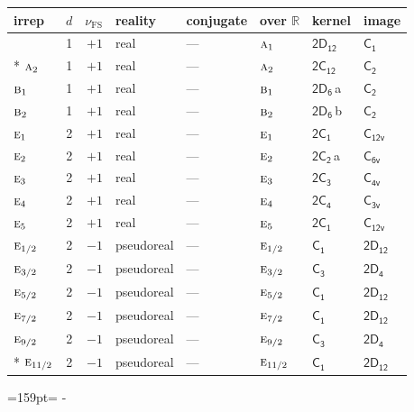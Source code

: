 \documentclass[10pt,a4paper]{article}
\makeatletter
\def\grouprule#1#2{\noalign{\marks\LTgroupmarks{\the\belowrulesep}\nobreak\vskip#1%
  \vskip\aboverulesep}\multispan\LT@cols\unskip{\leaders\hrule\@height#2\hfill\kern\z@}\cr
  \noalign{\penalty\LTrulebreak\vskip\belowrulesep\global\@lastruleclass\z@}}
\newcommand{\needspace}[1]{\par\penalty-100\begingroup\dimen0=#1\relax\dimen2=\pagegoal
  \advance\dimen2-\pagetotal\ifdim\dimen0>\dimen2\relax\ifdim\dimen2>0pt\vfil\break\fi\fi
  \endgroup}
\numberwithin{equation}{section}
\newcommand{\grp}[1]{\mathsf{#1}}
\newcommand{\irr}[1]{\text{\normalfont\scshape #1}}
\newcommand{\detbox}[1]{{\setlength{\fboxsep}{1pt}\fbox{#1}}}
\newcommand{\clsletter}[1]{\,{\scriptsize\color{black!55}#1}}
\newcommand{\fsind}{\nu_{\mathrm{FS}}}
\makeatother
\begin{document}
\setlength{\emergencystretch}{2em}\par\setlength{\emergencystretch}{0pt}
{\small\renewcommand{\arraystretch}{1.25}\setlength{\tabcolsep}{4pt}\begin{longtable}{@{}lrrlllll@{}}\toprule
irrep & $d$ & $\fsind$ & reality & conjugate & over $\mathbb{R}$ & kernel & image\\\midrule\endhead
\bottomrule\endfoot\endlastfoot
\detbox{$\irr{a}_{1}$} & 1 & $+1$ & real & --- & $\irr{a}_{1}$ & \href{2D12.pdf}{$\grp{2D_{12}}$} & \href{../../../rotation/data/pdf/C1.pdf}{$\grp{C_{1}}$}\\*
$\irr{a}_{2}$ & 1 & $+1$ & real & --- & $\irr{a}_{2}$ & \href{2C12.pdf}{$\grp{2C_{12}}$} & \href{../../../rotation/data/pdf/C2.pdf}{$\grp{C_{2}}$}\\
$\irr{b}_{1}$ & 1 & $+1$ & real & --- & $\irr{b}_{1}$ & \href{2D6.pdf}{$\grp{2D_{6}}$}\clsletter{a} & \href{../../../rotation/data/pdf/C2.pdf}{$\grp{C_{2}}$}\\
$\irr{b}_{2}$ & 1 & $+1$ & real & --- & $\irr{b}_{2}$ & \href{2D6.pdf}{$\grp{2D_{6}}$}\clsletter{b} & \href{../../../rotation/data/pdf/C2.pdf}{$\grp{C_{2}}$}\\
$\irr{e}_{1}$ & 2 & $+1$ & real & --- & $\irr{e}_{1}$ & \href{2C1.pdf}{$\grp{2C_{1}}$} & \href{../../../rotation/data/pdf/C12v.pdf}{$\grp{C_{12v}}$}\\
$\irr{e}_{2}$ & 2 & $+1$ & real & --- & $\irr{e}_{2}$ & \href{2C2.pdf}{$\grp{2C_{2}}$}\clsletter{a} & \href{../../../rotation/data/pdf/C6v.pdf}{$\grp{C_{6v}}$}\\
$\irr{e}_{3}$ & 2 & $+1$ & real & --- & $\irr{e}_{3}$ & \href{2C3.pdf}{$\grp{2C_{3}}$} & \href{../../../rotation/data/pdf/C4v.pdf}{$\grp{C_{4v}}$}\\
$\irr{e}_{4}$ & 2 & $+1$ & real & --- & $\irr{e}_{4}$ & \href{2C4.pdf}{$\grp{2C_{4}}$} & \href{../../../rotation/data/pdf/C3v.pdf}{$\grp{C_{3v}}$}\\
$\irr{e}_{5}$ & 2 & $+1$ & real & --- & $\irr{e}_{5}$ & \href{2C1.pdf}{$\grp{2C_{1}}$} & \href{../../../rotation/data/pdf/C12v.pdf}{$\grp{C_{12v}}$}\\
\grouprule{0pt}{\lightrulewidth}
$\irr{e}_{1/2}$ & 2 & $-1$ & pseudoreal & --- & $\irr{e}_{1/2}$ & \href{C1.pdf}{$\grp{C_{1}}$} & \href{2D12.pdf}{$\grp{2D_{12}}$}\\
$\irr{e}_{3/2}$ & 2 & $-1$ & pseudoreal & --- & $\irr{e}_{3/2}$ & \href{C3.pdf}{$\grp{C_{3}}$} & \href{2D4.pdf}{$\grp{2D_{4}}$}\\
$\irr{e}_{5/2}$ & 2 & $-1$ & pseudoreal & --- & $\irr{e}_{5/2}$ & \href{C1.pdf}{$\grp{C_{1}}$} & \href{2D12.pdf}{$\grp{2D_{12}}$}\\
$\irr{e}_{7/2}$ & 2 & $-1$ & pseudoreal & --- & $\irr{e}_{7/2}$ & \href{C1.pdf}{$\grp{C_{1}}$} & \href{2D12.pdf}{$\grp{2D_{12}}$}\\
$\irr{e}_{9/2}$ & 2 & $-1$ & pseudoreal & --- & $\irr{e}_{9/2}$ & \href{C3.pdf}{$\grp{C_{3}}$} & \href{2D4.pdf}{$\grp{2D_{4}}$}\\*
$\irr{e}_{11/2}$ & 2 & $-1$ & pseudoreal & --- & $\irr{e}_{11/2}$ & \href{C1.pdf}{$\grp{C_{1}}$} & \href{2D12.pdf}{$\grp{2D_{12}}$}\\
\bottomrule\end{longtable}}
\needspace{159pt}
\end{document}
